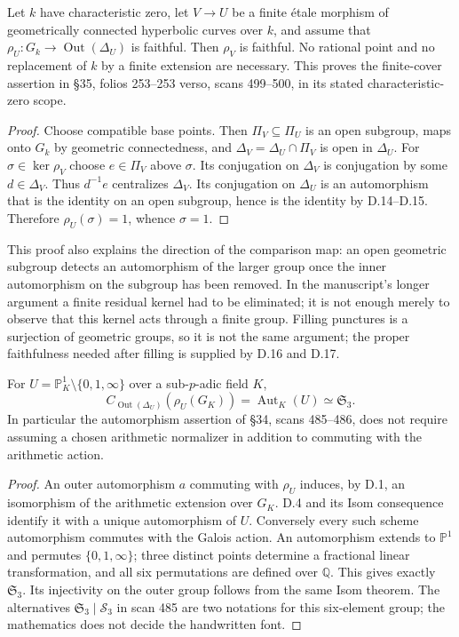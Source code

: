 Let $k$ have characteristic zero, let $V\to U$ be a finite \'etale morphism
of geometrically connected hyperbolic curves over $k$, and assume that
$\rho_U:G_k\to\operatorname{Out}(\Delta_U)$ is faithful.  Then $\rho_V$
is faithful.  No rational point and no replacement of $k$ by a finite
extension are necessary.  This proves the finite-cover assertion in \S35,
folios 253--253 verso, scans 499--500, in its stated characteristic-zero scope.
\begin{proof}
Choose compatible base points.  Then $\Pi_V\subseteq\Pi_U$ is an open
subgroup, maps onto $G_k$ by geometric connectedness, and
$\Delta_V=\Delta_U\cap\Pi_V$ is open in $\Delta_U$.
For $\sigma\in\ker\rho_V$ choose $e\in\Pi_V$ above $\sigma$.
Its conjugation on $\Delta_V$ is conjugation by some $d\in\Delta_V$.
Thus $d^{-1}e$ centralizes $\Delta_V$.  Its conjugation on $\Delta_U$ is
an automorphism that is the identity on an open subgroup, hence is the
identity by D.14--D.15.  Therefore $\rho_U(\sigma)=1$, whence $\sigma=1$.
\end{proof}
This proof also explains the direction of the comparison map: an open
geometric subgroup detects an automorphism of the larger group once the
inner automorphism on the subgroup has been removed.  In the manuscript's
longer argument a finite residual kernel had to be eliminated; it is not
enough merely to observe that this kernel acts through a finite group.
Filling punctures is a surjection of geometric groups, so it is not the
same argument; the proper faithfulness needed after filling is supplied by
D.16 and D.17.

For $U=\mathbb P^1_K\setminus\{0,1,\infty\}$ over a sub-$p$-adic field $K$,
\[
 C_{\operatorname{Out}(\Delta_U)}(\rho_U(G_K))
       =\operatorname{Aut}_K(U)\simeq\mathfrak S_3.
\]
In particular the automorphism assertion of \S34, scans 485--486, does not
require assuming a chosen arithmetic normalizer in addition to commuting
with the arithmetic action.
\begin{proof}
An outer automorphism $a$ commuting with $\rho_U$ induces, by D.1, an
isomorphism of the arithmetic extension over $G_K$.
D.4 and its Isom consequence identify it with a unique automorphism of $U$.
Conversely every such scheme automorphism commutes with the Galois action.
An automorphism extends to $\mathbb P^1$ and permutes $\{0,1,\infty\}$;
three distinct points determine a fractional linear transformation, and all
six permutations are defined over $\mathbb Q$.  This gives exactly
$\mathfrak S_3$.  Its injectivity on the outer group follows from the same
Isom theorem.  The alternatives $\mathfrak S_3\mid\mathcal S_3$ in scan 485
are two notations for this six-element group; the mathematics does not decide
the handwritten font.
\end{proof}

